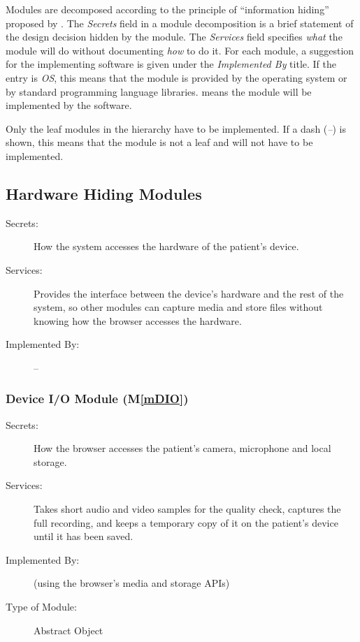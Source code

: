 \documentclass[12pt, titlepage]{article}
\newcommand{\mref}[1]{M\ref{#1}}
\begin{document}
Modules are decomposed according to the principle of ``information hiding''
proposed by \citet{ParnasEtAl1984}. The \emph{Secrets} field in a module
decomposition is a brief statement of the design decision hidden by the
module. The \emph{Services} field specifies \emph{what} the module will do
without documenting \emph{how} to do it. For each module, a suggestion for the
implementing software is given under the \emph{Implemented By} title. If the
entry is \emph{OS}, this means that the module is provided by the operating
system or by standard programming language libraries.  \emph{\progname{}} means the
module will be implemented by the \progname{} software.

Only the leaf modules in the hierarchy have to be implemented. If a dash
(\emph{--}) is shown, this means that the module is not a leaf and will not have
to be implemented.

\subsection{Hardware Hiding Modules}

\begin{description}
\item[Secrets:]How the system accesses the hardware of the patient's device.
\item[Services:]Provides the interface between the device's hardware and the rest of the system, so other modules
  can capture media and store files without knowing how the browser accesses the hardware.
\item[Implemented By:] --
\end{description}

\subsubsection{Device I/O Module (\mref{mDIO})}
\begin{description}
\item[Secrets:]How the browser accesses the patient's camera, microphone and local storage.
\item[Services:]Takes short audio and video samples for the quality check, captures the full recording, and keeps a temporary copy of it on the patient's device until it has been saved.
\item[Implemented By:] \progname{} (using the browser's media and storage APIs)
\item[Type of Module:] Abstract Object
\end{description}
\end{document}
